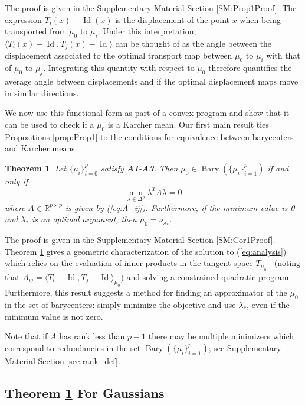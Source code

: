 \documentclass[nohyperref]{article}
\DeclareMathOperator*{\bary}{Bary}
\DeclareMathOperator*{\id}{Id}
\DeclareMathOperator{\Pac}{\mathcal{P}_{2,ac}(\mathbb{R}^d)}
\newtheorem{theorem}{Theorem}
\theoremstyle{definition}
\begin{document}
The proof is given in the Supplementary Material Section \ref{SM:Prop1Proof}.  The expression $T_i(x) - \id(x)$ is the displacement of the point $x$ when being transported from $\mu_0$ to $\mu_i$. Under this interpretation, $\langle T_i(x) - \id, T_j(x) - \id \rangle$ can be thought of as the angle between the displacement associated to the optimal transport map between $\mu_0$ to $\mu_i$ with that of $\mu_0$ to $\mu_j$. Integrating this quantity with respect to $\mu_0$ therefore quantifies the average angle between displacements and if the optimal displacement maps move in similar directions.

We now use this functional form as part of a convex program and show that it can be used to check if a $\mu_0$ is a Karcher mean. Our first main result ties Propositions \ref{prop:Prop1} to the conditions for equivalence between barycenters and Karcher means.
\begin{theorem} \label{thm:main}
Let $\{\mu_{i}\}_{i=0}^{p}$ satisfy \textbf{A1}-\textbf{A3}. Then $\mu_0\in \bary(\{\mu_{i}\}_{i=1}^{p})$ if and only if 
\[\min_{\lambda\in\Delta^{p}} \lambda^TA\lambda = 0\]
where $A \in \mathbb{R}^{p \times p}$ is given by (\ref{eq:A_ij}). Furthermore, if the minimum value is 0 and $\lambda_*$ is an optimal argument, then $\mu_0 = \nu_{\lambda_*}$.
\end{theorem}

The proof is given in the Supplementary Material Section \ref{SM:Cor1Proof}. Theorem \ref{thm:main} gives a geometric characterization of the solution to (\ref{eq:analysis}) which relies on the evaluation of inner-products in the tangent space $T_{\mu_0}\Pac$ (noting that $A_{ij} = \langle T_i - \id, T_j - \id \rangle_{\mu_0}$) and solving a constrained quadratic program.  Furthermore, this result suggests a method for finding an approximator of the $\mu_0$ in the set of barycenters: simply minimize the objective and use $\lambda_*$, even if the minimum value is not zero. 

Note that if $A$ has rank less than $p-1$ there may be multiple minimizers which correspond to redundancies in the set $\bary(\{\mu_i\}_{i=1}^{p})$; see Supplementary Material Section \ref{sec:rank_def}.

\subsection{Theorem \ref{thm:main} For Gaussians}\label{subsec:SpecialCases}
\end{document}
